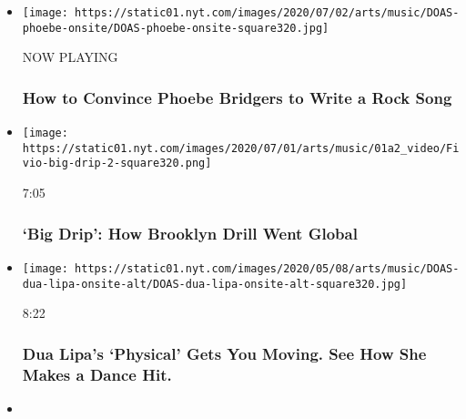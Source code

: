 \begin{itemize}
\item
  \texttt{[image: https://static01.nyt.com/images/2020/07/02/arts/music/DOAS-phoebe-onsite/DOAS-phoebe-onsite-square320.jpg]}

  NOW PLAYING

  \hypertarget{how-to-convince-phoebe-bridgers-to-write-a-rock-song-2}{%
  \subsubsection{How to Convince Phoebe Bridgers to Write a Rock
  Song}\label{how-to-convince-phoebe-bridgers-to-write-a-rock-song-2}}
\item
  \href{https://www.nytimes.com/video/arts/music/100000007062892/big-drip-fivio-foreign-brooklyn-drill.html?action=click\&module=video-series-bar\&region=header\&pgtype=Article\&playlistId=video/diaryofasong}{}

  \texttt{[image: https://static01.nyt.com/images/2020/07/01/arts/music/01a2\_video/Fivio-big-drip-2-square320.png]}

  7:05

  \hypertarget{big-drip-how-brooklyn-drill-went-global}{%
  \subsubsection{`Big Drip': How Brooklyn Drill Went
  Global}\label{big-drip-how-brooklyn-drill-went-global}}
\item
  \href{https://www.nytimes.com/video/arts/music/100000007062893/dua-lipa-physical-song.html?action=click\&module=video-series-bar\&region=header\&pgtype=Article\&playlistId=video/diaryofasong}{}

  \texttt{[image: https://static01.nyt.com/images/2020/05/08/arts/music/DOAS-dua-lipa-onsite-alt/DOAS-dua-lipa-onsite-alt-square320.jpg]}

  8:22

  \hypertarget{dua-lipas-physical-gets-you-moving-see-how-she-makes-a-dance-hit}{%
  \subsubsection{Dua Lipa's `Physical' Gets You Moving. See How She
  Makes a Dance
  Hit.}\label{dua-lipas-physical-gets-you-moving-see-how-she-makes-a-dance-hit}}
\item
  \href{https://www.nytimes.com/video/arts/music/100000006962812/grimes-delete-forever.html?action=click\&module=video-series-bar\&region=header\&pgtype=Article\&playlistId=video/diaryofasong}{}


\end{itemize}
